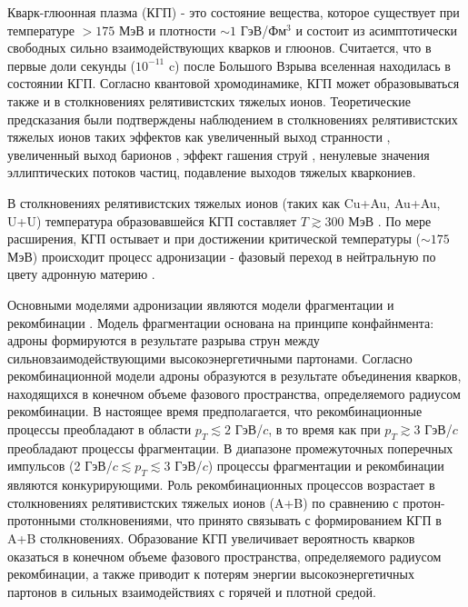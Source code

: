 {\actuality} Кварк-глюонная плазма (КГП) - это состояние вещества, которое существует при температуре $>175$ МэВ и плотности $\sim1$ ГэВ/Фм$^3$ \autocite{QGP} и состоит из асимптотически свободных сильно взаимодействующих кварков и глюонов. Считается, что в первые доли секунды ($10^{-11}$ c) после Большого Взрыва вселенная находилась в состоянии КГП. Согласно квантовой хромодинамике, КГП может образовываться также и в столкновениях релятивистских тяжелых ионов. Теоретические предсказания были подтверждены наблюдением в столкновениях релятивистских тяжелых ионов таких эффектов как увеличенный выход странности \autocite{StrangEnh, Strangeness_QGP}, увеличенный выход барионов \autocite{BaryonPuzzleHeavy,p2piRatio_2003,p2piRatio_130GeV}, эффект гашения струй \autocite{JetQuenching1, JetQuenching2, JetQuenching3}, ненулевые значения эллиптических потоков частиц, подавление выходов тяжелых кваркониев. 


В столкновениях релятивистских тяжелых ионов (таких как Cu+Au, Au+Au, U+U) температура образовавшейся КГП составляет $T\gtrsim300$ МэВ \autocite{Coalescence_models}. По мере расширения, КГП остывает и при достижении критической температуры ($\sim175$ МэВ) происходит процесс адронизации \cite{QGP, QGP, Coalescence_models} - фазовый переход в нейтральную по цвету адронную материю \autocite{nucleus2020}. 

Основными моделями адронизации являются модели фрагментации \cite{FragmentationLund} и рекомбинации \autocite{Coalescence_models, Recombination1, Recombination2}. Модель фрагментации основана на принципе конфайнмента: адроны формируются в результате разры­ва струн между сильновзаимодействующими высокоэнергетичными партонами.
Согласно рекомбинационной модели адроны образуются в результате объединения кварков, находящихся в конечном объеме фазового пространства, определяемого радиусом рекомбинации. 
В настоящее время предполагается, что рекомбинационные процессы преобладают в области $p_T \lesssim 2$ ГэВ/$c$, в то время как при $p_T \gtrsim 3$ ГэВ/$c$ преобладают
процессы фрагментации. В диапазоне промежуточных поперечных импульсов (2 ГэВ/$c \lesssim p_T \lesssim 3$ ГэВ/$c$) процессы фрагментации и рекомбинации являют­ся конкурирующими.
Роль рекомбинационных процессов возрастает в столкновениях релятивистских тяжелых ионов (A+B) по сравнению с протон-протонными столкновениями, что принято связывать \cite{Recombination1, Recombination2, BaryonPuzzleHeavy} с формированием КГП в A+B столкновениях.
Образование КГП увеличивает вероятность кварков оказаться в конечном объеме фазового пространства, определяемого радиусом рекомбинации, а также приводит к потерям энергии высокоэнергетичных партонов в сильных взаимодействиях с горячей и плотной средой.

